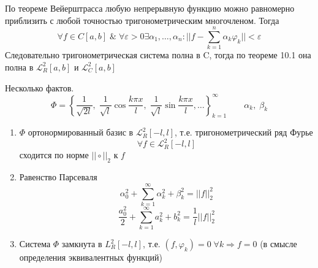 \begin{greyProof}
	По теореме Вейерштрасса любую непрерывную функцию можно равномерно приблизить с любой точностью тригонометрическим многочленом. Тогда \[
		\forall f \in C[a,b]\;\&\; \forall\varepsilon>0 \exists \alpha_1,\ldots,\alpha_n: ||f - \sum_{k=1}^n \alpha_k\varphi_k || < \varepsilon
	\]
	Следовательно тригонометрическая система полна в C, тогда по теореме 10.1 она полна в $ \mathcal{L}_R^2[a,b] $ и $ \mathcal{L}_C^2[a,b] $
\end{greyProof}
\begin{greySmth}{Несколько фактов.}
\[
\Phi = \left\{   \dfrac{1}{\sqrt{2l}},\; \dfrac{1}{\sqrt{l}}\cos \dfrac{k\pi x}{l},\; \dfrac{1}{\sqrt{l}}\sin \dfrac{k\pi x}{l}, \ldots   \right\}_{k=1}^\infty \qquad \alpha_k,\; \beta_k
\]
	\begin{enumerate}
	\item 	$ \Phi $ ортонормированный базис в $ \mathcal{L}_R^2[-l,l] $, т.е. тригонометрический ряд Фурье $$ \forall f \in \mathcal{L}_R^2[-l,l] $$ сходится по норме $ ||\circ||_2 $ к $ f $
	\item Равенство Парсеваля $$ \alpha_0^2 + \sum_{k=1}^\infty \alpha_k^2 + \beta_k^2 = ||f||^2_2 $$
	$$ \dfrac{a_0^2}{2} + \sum_{k=1}^\infty a_k^2 + b_k^2 = \dfrac{1}{l} ||f||_2^2 $$
	\item Система $ \Phi $ замкнута в $ L_R^2[-l,l] $, т.е. $ (f,\varphi_k)=0 \;\forall k \Rightarrow f =0 $ (в смысле определения эквивалентных функций)
	\end{enumerate}
\end{greySmth}